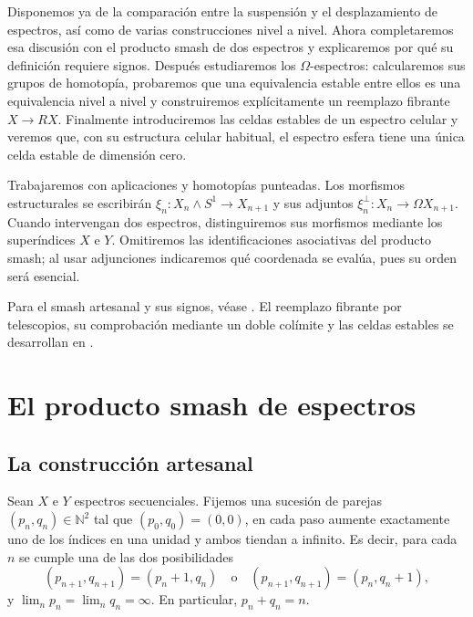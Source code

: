 Disponemos ya de la comparación entre la suspensión y el desplazamiento de espectros, así como de varias construcciones nivel a nivel. Ahora completaremos esa discusión con el producto smash de dos espectros y explicaremos por qué su definición requiere signos. Después estudiaremos los $\Omega$-espectros: calcularemos sus grupos de homotopía, probaremos que una equivalencia estable entre ellos es una equivalencia nivel a nivel y construiremos explícitamente un reemplazo fibrante $X\to RX$. Finalmente introduciremos las celdas estables de un espectro celular y veremos que, con su estructura celular habitual, el espectro esfera tiene una única celda estable de dimensión cero.

Trabajaremos con aplicaciones y homotopías punteadas. Los morfismos estructurales se escribirán $\xi_n\colon X_n\wedge S^1\to X_{n+1}$ y sus adjuntos $\xi_n^{\perp}\colon X_n\to\Omega X_{n+1}$. Cuando intervengan dos espectros, distinguiremos sus morfismos mediante los superíndices $X$ e $Y$. Omitiremos las identificaciones asociativas del producto smash; al usar adjunciones indicaremos qué coordenada se evalúa, pues su orden será esencial.

Para el smash artesanal y sus signos, véase \cite[parte~III, \S4, pp.~161--164]{adams1974}. El reemplazo fibrante por telescopios, su comprobación mediante un doble colímite y las celdas estables se desarrollan en \cite[proposición~2.2.0.9 y \S2.6.1]{malkiewich}.

\section{El producto smash de espectros}

\subsection{La construcción artesanal}

Sean $X$ e $Y$ espectros secuenciales. Fijemos una sucesión de parejas $(p_n,q_n)\in\mathbb N^2$ tal que $(p_0,q_0)=(0,0)$, en cada paso aumente exactamente uno de los índices en una unidad y ambos tiendan a infinito. Es decir, para cada $n$ se cumple una de las dos posibilidades
\[
(p_{n+1},q_{n+1})=(p_n+1,q_n)
\quad\text{o}\quad
(p_{n+1},q_{n+1})=(p_n,q_n+1),
\]
y $\lim_n p_n=\lim_n q_n=\infty$. En particular, $p_n+q_n=n$.

